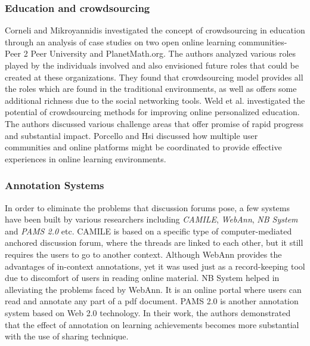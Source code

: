 \documentclass{llncs}
\begin{document}
\subsubsection{Education and crowdsourcing}
Corneli and Mikroyannidis\cite{Chapter2012} investigated the concept of crowdsourcing in education through an analysis of case studies on two open online learning communities- Peer 2 Peer University and PlanetMath.org. The authors analyzed various roles played by the individuals involved and also envisioned future roles that could be created at these organizations. They found that crowdsourcing model provides all the roles which are found in the traditional environments, as well as offers some additional richness due to the social networking tools. Weld et al.\cite{Weld2012a} investigated the potential of crowdsourcing methods for improving online personalized education. The authors discussed various challenge areas that offer promise of rapid progress and substantial impact. Porcello and Hsi\cite{Porcello2013} discussed how multiple user communities and online platforms might be coordinated to provide effective experiences in online learning environments.
\subsubsection{Annotation Systems}
In order to eliminate the problems that discussion forums pose, a few systems have been built by various researchers including \textit{CAMILE}\cite{Guzdial2000}, \textit{WebAnn}\cite{Marshall2002}, \textit{NB System}\cite{Zyto2012} and \textit{PAMS 2.0}\cite{Su2010} etc. CAMILE is based on a specific type of computer-mediated anchored discussion forum, where the threads are linked to each other, but it still requires the users to go to another context. Although WebAnn provides the advantages of in-context annotations, yet it was used just as a record-keeping tool due to discomfort of users in reading online material. NB System helped in alleviating the problems faced by WebAnn. It is an online portal where users can read and annotate any part of a pdf document. PAMS 2.0 is another annotation system based on Web 2.0 technology. In their work, the authors demonstrated that the effect of annotation on learning achievements becomes more substantial with the use of sharing technique. 
\end{document}
